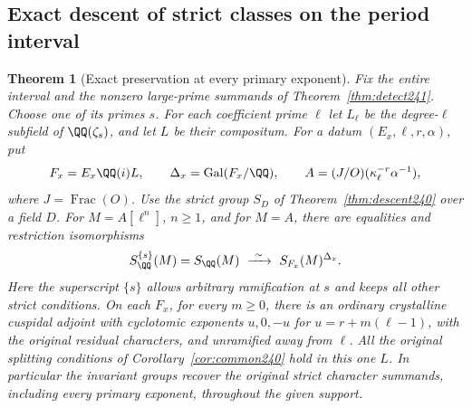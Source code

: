 \documentclass[a4paper,11pt]{article}
\newtheorem{theorem}[proposition]{Theorem}
\theoremstyle{definition}
\theoremstyle{remark}
\numberwithin{equation}{section}
\begin{document}
\subsection{Exact descent of strict classes on the period interval}\label{nav:I-50}
\begin{theorem}[Exact preservation at every primary exponent]
\label{thm:exact241}
Fix the entire interval and the nonzero large-prime summands
of Theorem~\ref{thm:detect241}. Choose one of its primes \(s\).
For each coefficient prime \(\ell\) let \(L_\ell\) be the
degree-\(\ell\) subfield of \(\QQ(\zeta_s)\), and let \(L\)
be their compositum. For a datum \((E_x,\ell,r,\alpha)\), put
\[
 F_x=E_x\QQ(i)L,\qquad \Delta_x=\operatorname{Gal}(F_x/\QQ),
 \qquad A=(J/O)(\kappa_\ell^{-r}\alpha^{-1}),
\]
where \(J=\operatorname{Frac}(O)\). Use the strict group
\(S_D\) of Theorem~\ref{thm:descent240} over a field \(D\).
For \(M=A[\ell^n]\), \(n\ge1\), and for \(M=A\), there are
equalities and restriction isomorphisms
\[
    S_\QQ^{\{s\}}(M)=S_\QQ(M)
        \ \xrightarrow{\ \sim\ }\ S_{F_x}(M)^{\Delta_x}.
\]
Here the superscript \(\{s\}\) allows arbitrary ramification
at \(s\) and keeps all other strict conditions. On each
\(F_x\), for every \(m\ge0\), there is an ordinary crystalline
cuspidal adjoint with cyclotomic exponents \(u,0,-u\) for
\(u=r+m(\ell-1)\), with the original residual characters,
and unramified away from \(\ell\). All the original
splitting conditions of Corollary~\ref{cor:common240} hold in
this one \(L\). In particular the invariant groups recover the
original strict character summands, including every primary
exponent, throughout the given support.
\end{theorem}
\end{document}

